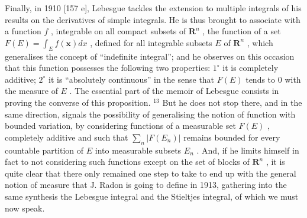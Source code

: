 Finally, in 1910 {[}157 e{]}, Lebesgue tackles the extension to multiple integrals of his results on the derivatives of simple integrals. He is thus brought to associate with a function \(f\) , integrable on all compact subsets of \(\mathbf{R}^n\) , the function of a set \(F(E) = \int_E f(\mathbf{x}) dx\) , defined for all integrable subsets \(E\) of \(\mathbf{R}^n\) , which generalises the concept of ``indefinite integral''; and he observes on this occasion that this function possesses the following two properties: \(1^\circ\) it is completely additive; \(2^\circ\) it is ``absolutely continuous'' in the sense that \(F(E)\) tends to 0 with the measure of \(E\) . The essential part of the memoir of Lebesgue consists in proving the converse of this proposition. \(^{13}\) But he does not stop there, and in the same direction, signals the possibility of generalising the notion of function with bounded variation, by considering functions of a measurable set \(F(E)\) , completely additive and such that \(\sum_n |F(E_n)|\) remains bounded for every countable partition of \(E\) into measurable subsets \(E_n\) . And, if he limits himself in fact to not considering such functions except on the set of blocks of \(\mathbf{R}^n\) , it is quite clear that there only remained one step to take to end up with the general notion of measure that J. Radon is going to define in 1913, gathering into the same synthesis the Lebesgue integral and the Stieltjes integral, of which we must now speak.

